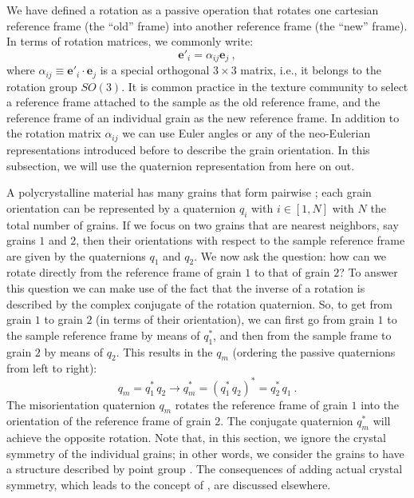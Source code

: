 We have defined a rotation as a passive operation that rotates one cartesian reference frame (the ``old'' frame) into another reference frame (the ``new'' frame).  In terms of rotation matrices, we commonly write:
\[
	\mathbf{e}'_i = \alpha_{ij}\mathbf{e}_j\ ,
\]
where $\alpha_{ij}\equiv \mathbf{e}'_i\cdot\mathbf{e}_j$ is a special orthogonal $3\times 3$ matrix, i.e., it belongs to the rotation group $SO(3)$. It is common practice in the texture community to select a reference frame attached to the sample as the old reference frame, and the reference frame of an individual grain as the new reference frame.  In addition to the rotation matrix $\alpha_{ij}$ we can use Euler angles or any of the neo-Eulerian representations introduced before to describe the grain orientation.  In this subsection, we will use the quaternion representation from here on out.

A polycrystalline material has many grains that form pairwise ; each grain orientation can be represented by a quaternion $q_i$ with $i\in[1,N]$ with $N$ the total number of grains.  If we focus on two grains that are nearest neighbors, say grains $1$ and $2$, then their orientations with respect to the sample reference frame are given by the quaternions $q_1$ and $q_2$.  We now ask the question: how can we rotate directly from the reference frame of grain $1$ to that of grain $2$?  To answer this question we can make use of the fact that the inverse of a rotation is described by the complex conjugate of the rotation quaternion.  So, to get from grain $1$ to grain $2$ (in terms of their orientation), we can first go from grain $1$ to the sample reference frame by means of $q_1^{\ast}$, and then from the sample frame to grain $2$ by means of $q_2$.  This results in the  $q_m$ (ordering the passive quaternions from left to right):
\begin{equation}
	q_m = q_1^{\ast}\,q_2\rightarrow q_m^{\ast} = (q_1^{\ast}\,q_2)^{\ast} = q_2^{\ast}\,q_1\ .\label{\chabbr:eq:misorientation}
\end{equation}
The misorientation quaternion $q_m$ rotates the reference frame of grain $1$ into the orientation of the reference frame of grain $2$.  The conjugate quaternion $q_m^{\ast}$ will achieve the opposite rotation.  Note that, in this section, we ignore the crystal symmetry of the individual grains; in other words, we consider the grains to have a structure described by point group .  The consequences of adding actual crystal symmetry, which leads to the concept of , are discussed elsewhere.


